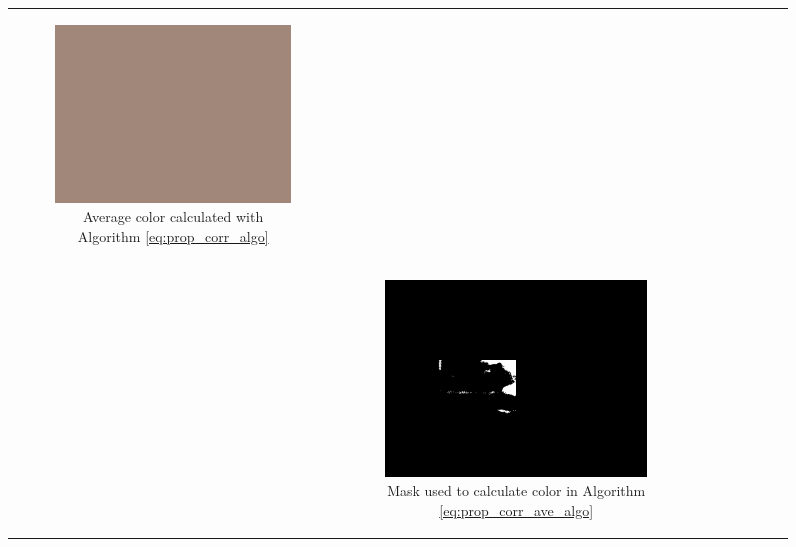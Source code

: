 \begin{figure}[H]
\begin{tabular}{ccc}
    \begin{subfigure}[b]{0.30\textwidth}
        \includegraphics[width=\textwidth]{images/ave_col_100}
        \caption{Average color calculated with Algorithm \ref{eq:prop_corr_algo}}\label{img:ave_col_100}
    \end{subfigure}\\
    &
    \begin{subfigure}[b]{0.30\textwidth}
        \includegraphics[width=\textwidth]{images/pale_ave_10_adjusted_mask}
        \caption{Mask used to calculate color in Algorithm \ref{eq:prop_corr_ave_algo}}\label{img:adjusted_mask}
    \end{subfigure} &
    \begin{subfigure}[b]{0.30\textwidth}

\end{subfigure}
\end{tabular}
\end{figure}
